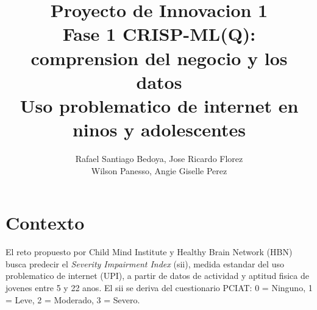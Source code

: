 \documentclass[10pt,letterpaper]{article}
\title{\textbf{Proyecto de Innovacion 1 \\ \small Fase 1 CRISP-ML(Q): comprension del negocio y los datos}\\[2pt]
\large Uso problematico de internet en ninos y adolescentes}
\author{Rafael Santiago Bedoya, Jose Ricardo Florez \\ Wilson Panesso, Angie Giselle Perez}
\date{}
\begin{document}
\maketitle
 
\section*{Contexto}
El reto propuesto por Child Mind Institute y Healthy Brain Network (HBN) busca predecir el
\emph{Severity Impairment Index} (sii), medida estandar del uso problematico de internet (UPI),
a partir de datos de actividad y aptitud fisica de jovenes entre 5 y 22 anos. El sii se deriva
del cuestionario PCIAT: 0 = Ninguno, 1 = Leve, 2 = Moderado, 3 = Severo.
 
\end{document}
